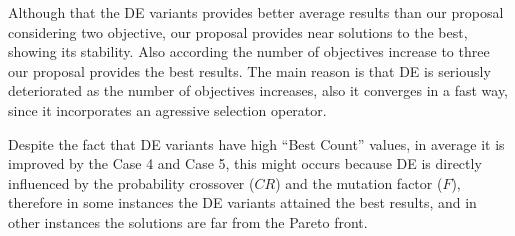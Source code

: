 Although that the DE variants provides better average results than our proposal considering two objective, our proposal provides near solutions to the best, showing its stability.
%
Also according the number of objectives increase to three our proposal provides the best results.
%
The main reason is that DE is seriously deteriorated as the number of objectives increases, also it converges in a fast way, since it incorporates an agressive selection operator.
%

Despite the fact that DE variants have high ``Best Count'' values, in average it is improved by the Case 4 and Case 5, this might occurs because DE is directly influenced by the probability crossover ($CR$) and the mutation factor ($F$), therefore in some instances the DE variants attained the best results, and in other instances the solutions are far from the Pareto front.
%

